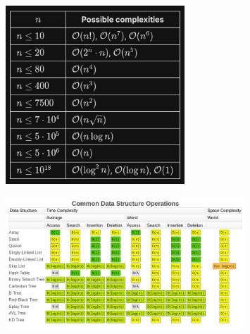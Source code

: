 

\begin{figure}[h]
	\centering
	\includegraphics[width=0.6\textwidth]{images/complexities.png}
\end{figure}

\vspace{1cm}

\begin{figure}[h]
	\centering
	\includegraphics[width=0.8\textwidth]{images/dsComplexities.png}
\end{figure}